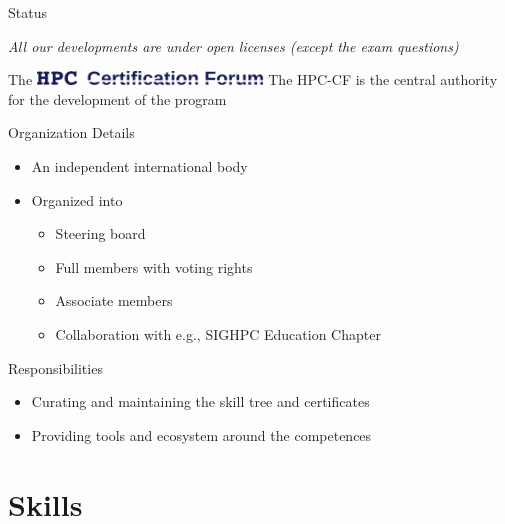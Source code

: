 \documentclass[compress,aspectratio=169]{beamer}
\begin{document}
\begin{frame}{Status}
\medskip

\textit{All our developments are under open licenses (except the exam questions)}
\end{frame}


\begin{frame}{The \includegraphics[width=0.45\textwidth]{hpccf-full}}
	The HPC-CF is the central authority for the development of the program

	\begin{block}{Organization Details}
		\begin{itemize}
			\item An independent international body
			\item Organized into
				\begin{itemize}
					\item Steering board
					\item Full members with voting rights
					\item Associate members
          \item Collaboration with e.g., SIGHPC Education Chapter
				\end{itemize}
		\end{itemize}
	\end{block}

	\begin{block}{Responsibilities}
		\begin{itemize}
			\item Curating and maintaining the skill tree and certificates
			\item Providing tools and ecosystem around the competences
		\end{itemize}
	\end{block}
\end{frame}

\section{Skills}
\sectionIntroHidden
\end{document}
